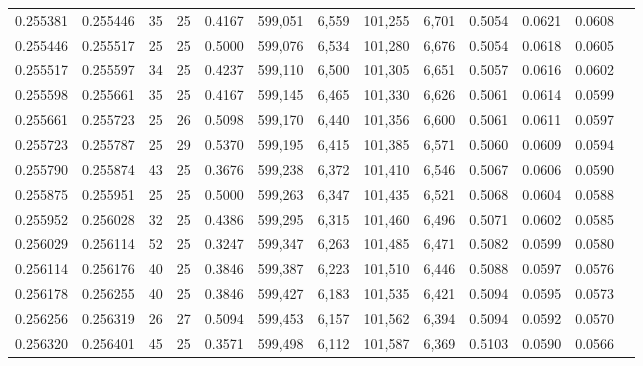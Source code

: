 \begin{tabular}{rrrrrrrrrrrrr}
0.255381 & 0.255446 &    35 &  25 &                                     0.4167 & 599,051 &   6,559 & 101,255 &   6,701 & 0.5054 & 0.0621 & 0.0608 \\
0.255446 & 0.255517 &    25 &  25 &                                     0.5000 & 599,076 &   6,534 & 101,280 &   6,676 & 0.5054 & 0.0618 & 0.0605 \\
0.255517 & 0.255597 &    34 &  25 &                                     0.4237 & 599,110 &   6,500 & 101,305 &   6,651 & 0.5057 & 0.0616 & 0.0602 \\
0.255598 & 0.255661 &    35 &  25 &                                     0.4167 & 599,145 &   6,465 & 101,330 &   6,626 & 0.5061 & 0.0614 & 0.0599 \\
0.255661 & 0.255723 &    25 &  26 &                                     0.5098 & 599,170 &   6,440 & 101,356 &   6,600 & 0.5061 & 0.0611 & 0.0597 \\
0.255723 & 0.255787 &    25 &  29 &                                     0.5370 & 599,195 &   6,415 & 101,385 &   6,571 & 0.5060 & 0.0609 & 0.0594 \\
0.255790 & 0.255874 &    43 &  25 &                                     0.3676 & 599,238 &   6,372 & 101,410 &   6,546 & 0.5067 & 0.0606 & 0.0590 \\
0.255875 & 0.255951 &    25 &  25 &                                     0.5000 & 599,263 &   6,347 & 101,435 &   6,521 & 0.5068 & 0.0604 & 0.0588 \\
0.255952 & 0.256028 &    32 &  25 &                                     0.4386 & 599,295 &   6,315 & 101,460 &   6,496 & 0.5071 & 0.0602 & 0.0585 \\
0.256029 & 0.256114 &    52 &  25 &                                     0.3247 & 599,347 &   6,263 & 101,485 &   6,471 & 0.5082 & 0.0599 & 0.0580 \\
0.256114 & 0.256176 &    40 &  25 &                                     0.3846 & 599,387 &   6,223 & 101,510 &   6,446 & 0.5088 & 0.0597 & 0.0576 \\
0.256178 & 0.256255 &    40 &  25 &                                     0.3846 & 599,427 &   6,183 & 101,535 &   6,421 & 0.5094 & 0.0595 & 0.0573 \\
0.256256 & 0.256319 &    26 &  27 &                                     0.5094 & 599,453 &   6,157 & 101,562 &   6,394 & 0.5094 & 0.0592 & 0.0570 \\
0.256320 & 0.256401 &    45 &  25 &                                     0.3571 & 599,498 &   6,112 & 101,587 &   6,369 & 0.5103 & 0.0590 & 0.0566 \\

\end{tabular}
